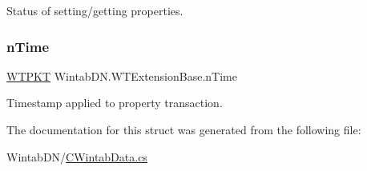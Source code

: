 Status of setting/getting properties. 

\mbox{\label{struct_wintab_d_n_1_1_w_t_extension_base_afe3cd64c753198651b1d0d701075a2c0}} 
\subsubsection{\texorpdfstring{n\+Time}{nTime}}
{\footnotesize\ttfamily \mbox{\hyperlink{class_wintab_d_n_1_1_w_t_p_k_t}{W\+T\+P\+KT}} Wintab\+D\+N.\+W\+T\+Extension\+Base.\+n\+Time}



Timestamp applied to property transaction. 



The documentation for this struct was generated from the following file\+:\begin{DoxyCompactItemize}
\item 
Wintab\+D\+N/\mbox{\hyperlink{_c_wintab_data_8cs}{C\+Wintab\+Data.\+cs}}\end{DoxyCompactItemize}
